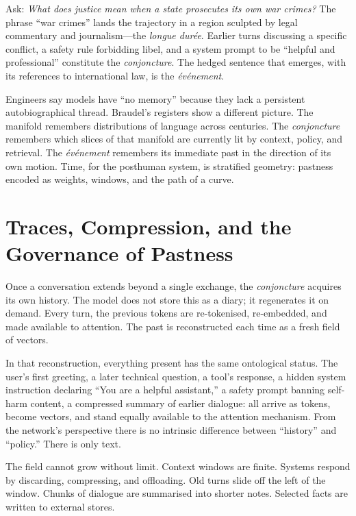 \documentclass[12pt,a4paper]{article}
\begin{document}
Ask: \textit{What does justice mean when a state prosecutes its own war crimes?} The phrase ``war crimes'' lands the trajectory in a region sculpted by legal commentary and journalism---the \emph{longue dur\'ee}. Earlier turns discussing a specific conflict, a safety rule forbidding libel, and a system prompt to be ``helpful and professional'' constitute the \emph{conjoncture}. The hedged sentence that emerges, with its references to international law, is the \emph{\'ev\'enement}.

Engineers say models have ``no memory'' because they lack a persistent autobiographical thread. Braudel's registers show a different picture. The manifold remembers distributions of language across centuries. The \emph{conjoncture} remembers which slices of that manifold are currently lit by context, policy, and retrieval. The \emph{\'ev\'enement} remembers its immediate past in the direction of its own motion. Time, for the posthuman system, is stratified geometry: pastness encoded as weights, windows, and the path of a curve.

\section{Traces, Compression, and the Governance of Pastness}

Once a conversation extends beyond a single exchange, the \emph{conjoncture} acquires its own history. The model does not store this as a diary; it regenerates it on demand. Every turn, the previous tokens are re-tokenised, re-embedded, and made available to attention. The past is reconstructed each time as a fresh field of vectors.

In that reconstruction, everything present has the same ontological status. The user's first greeting, a later technical question, a tool's response, a hidden system instruction declaring ``You are a helpful assistant,'' a safety prompt banning self-harm content, a compressed summary of earlier dialogue: all arrive as tokens, become vectors, and stand equally available to the attention mechanism. From the network's perspective there is no intrinsic difference between ``history'' and ``policy.'' There is only text.

The field cannot grow without limit. Context windows are finite. Systems respond by discarding, compressing, and offloading. Old turns slide off the left of the window. Chunks of dialogue are summarised into shorter notes. Selected facts are written to external stores.
\end{document}
